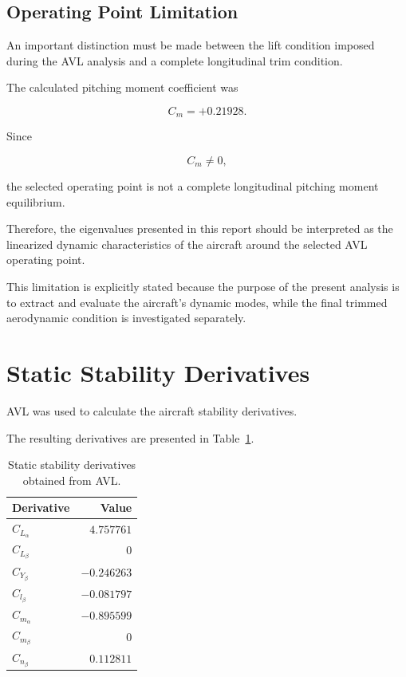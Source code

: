 \documentclass[11pt,a4paper]{article}
\begin{document}
\subsection{Operating Point Limitation}

An important distinction must be made between the lift condition imposed
during the AVL analysis and a complete longitudinal trim condition.

The calculated pitching moment coefficient was

\begin{equation}
C_m=+0.21928.
\end{equation}

Since

\begin{equation}
C_m\neq0,
\end{equation}

the selected operating point is not a complete longitudinal pitching
moment equilibrium.

Therefore, the eigenvalues presented in this report should be interpreted
as the linearized dynamic characteristics of the aircraft around the
selected AVL operating point.

This limitation is explicitly stated because the purpose of the present
analysis is to extract and evaluate the aircraft's dynamic modes, while
the final trimmed aerodynamic condition is investigated separately.

\section{Static Stability Derivatives}

AVL was used to calculate the aircraft stability derivatives.

The resulting derivatives are presented in
Table~\ref{tab:static_derivatives}.

\begin{table}[H]
\centering
\caption{Static stability derivatives obtained from AVL.}
\label{tab:static_derivatives}
\begin{tabular}{lr}
\toprule
Derivative & Value \\
\midrule
$C_{L_\alpha}$ & $4.757761$ \\
$C_{L_\beta}$ & $0$ \\
$C_{Y_\beta}$ & $-0.246263$ \\
$C_{l_\beta}$ & $-0.081797$ \\
$C_{m_\alpha}$ & $-0.895599$ \\
$C_{m_\beta}$ & $0$ \\
$C_{n_\beta}$ & $0.112811$ \\
\bottomrule
\end{tabular}
\end{table}
\end{document}
